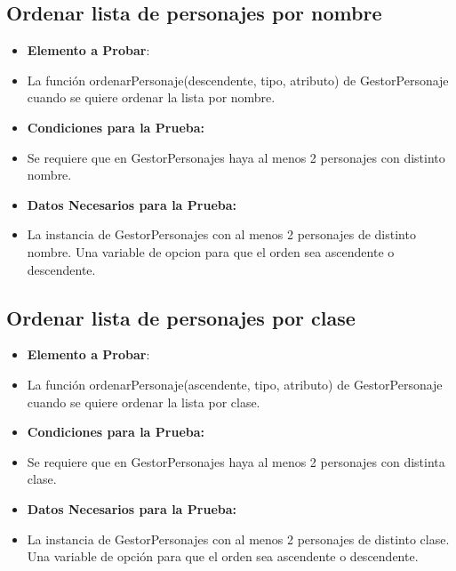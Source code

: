 \documentclass{article}
\begin{document}
\subsection{Ordenar lista de personajes por nombre}
\renewcommand{\labelitemi}{}
\begin{itemize}

\item \textbf{Elemento a Probar}: 

\item La función ordenarPersonaje(descendente, tipo, atributo) de GestorPersonaje cuando se quiere ordenar la lista por nombre.

\item \textbf{Condiciones para la Prueba:}

\item Se requiere que en GestorPersonajes haya al menos 2 personajes con distinto nombre.

\item \textbf{Datos Necesarios para la Prueba:}

\item La instancia de GestorPersonajes con al menos 2 personajes de distinto nombre.
Una variable de opcion para que el orden sea ascendente o descendente.

\end{itemize}

\subsection{Ordenar lista de personajes por clase}
\renewcommand{\labelitemi}{}
\begin{itemize}

\item \textbf{Elemento a Probar}: 

\item La función ordenarPersonaje(ascendente, tipo, atributo) de GestorPersonaje cuando se quiere ordenar la lista por clase.

\item \textbf{Condiciones para la Prueba:}

\item Se requiere que en GestorPersonajes haya al menos 2 personajes con distinta clase.   

\item \textbf{Datos Necesarios para la Prueba:}

\item La instancia de GestorPersonajes con al menos 2 personajes de distinto clase. Una variable de opción para que el orden sea ascendente o descendente.

\end{itemize}
\end{document}
